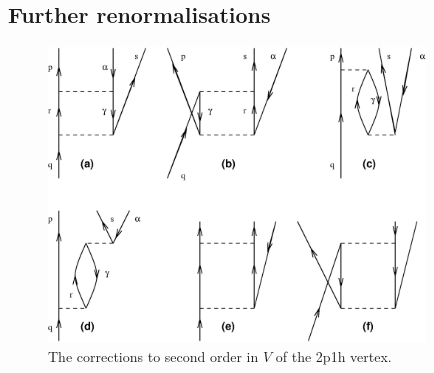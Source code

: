 \subsection{Further renormalisations}

\begin{figure}[tb]
	\begin{center}
      	\includegraphics[width=10cm]{ph21.eps}
	\end{center}
       \caption{The corrections to second order in $V$ of the 2p1h
               vertex.}
       \label{Morten:fig:2p1hvertex}
\end{figure}


